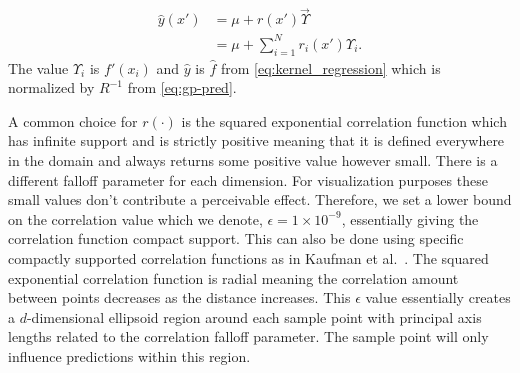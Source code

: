 \begin{align*}
  \hat{y}(x') &= \mu + r(x') \vec{\Upsilon} \\
              &= \mu + \sum_{i=1}^N r_i(x') \Upsilon_i \text{.}
\end{align*}
The value $\Upsilon_i$ is $f'(x_i)$ and $\hat{y}$ is $\hat{f}$ from 
\autoref{eq:kernel_regression} which is normalized by $R^{-1}$ from 
\autoref{eq:gp-pred}.


A common choice for $r(\cdot)$ is the squared exponential correlation
function
which has infinite support and is strictly 
positive meaning that it is defined everywhere in the domain and always 
returns some positive value however small. 
There is a different falloff
parameter for each dimension.
For visualization purposes these small values don't contribute a
perceivable effect.
Therefore, we set a lower bound on the correlation value which we denote,
$\epsilon = 1 \times 10^{-9}$, essentially giving the correlation function
compact support. This can also be done using specific compactly supported 
correlation functions as in
Kaufman et al.~\cite{Kaufman:2011}. 
The squared exponential correlation function is radial meaning the
correlation amount between points decreases as the distance increases.
This $\epsilon$ value essentially creates a $d$-dimensional ellipsoid region
around each sample point with principal axis lengths related to the 
correlation falloff parameter. The sample point will only influence 
predictions within this region.



